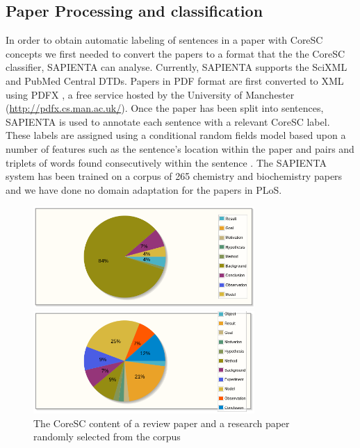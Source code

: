 \documentclass{svmult}
\begin{document}
\subsection*{Paper Processing and classification}
In order to obtain automatic labeling of sentences in a paper with
CoreSC concepts we first needed to convert the papers to a format that
the the CoreSC classifier, SAPIENTA can analyse.  Currently, SAPIENTA
supports the SciXML and PubMed Central DTDs.  Papers in PDF format are
first converted to XML using PDFX %
, a free service hosted by the University of Manchester
(\url{http://pdfx.cs.man.ac.uk/}). Once the paper has been split into
sentences, SAPIENTA is used to annotate each sentence with a relevant
CoreSC label. These labels are assigned using a conditional random
fields model based upon a number of features such as the sentence's
location within the paper and pairs and triplets of words found
consecutively within the sentence \cite{Liakata2012}.  The SAPIENTA
system has been trained on a corpus of 265 chemistry and biochemistry
papers and we have done no domain adaptation for the papers in PLoS.



\begin{figure}[t]

\centering

\includegraphics[width=0.75\textwidth]{figures/review_corescs.png}

\includegraphics[width=0.75\textwidth]{figures/report_corescs.png}

\caption{The CoreSC content of a review paper and a research paper randomly selected from the corpus}

\label{fig:coresc_pies} 
\end{figure}
\end{document}

